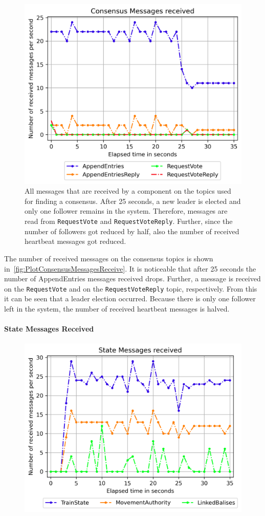 \begin{figure}[!hb]
	\centering
	\includegraphics[width=0.75\linewidth]{images/plots/ConsensusMessagesReceive}
	\caption{All messages that are received by a component on the topics used for finding a consensus. After 25 seconds, a new leader is elected and only one follower remains in the system. Therefore, messages are read from \texttt{RequestVote} and \texttt{RequestVoteReply}. Further, since the number of followers got reduced by half, also the number of received heartbeat messages got reduced.}
	\label{fig:PlotConsensusMessagesReceive}
\end{figure}

The number of received messages on the consensus topics is shown in~\autoref{fig:PlotConsensusMessagesReceive}.
It is noticeable that after 25 seconds the number of AppendEntries messages received drops.
Further, a message is received on the \texttt{RequestVote} and on the \texttt{RequestVoteReply} topic, respectively.
From this it can be seen that a leader election occurred.
Because there is only one follower left in the system, the number of received heartbeat messages is halved.


\iffalse
\paragraph{State Messages Received}

\begin{figure}[!hb]
	\centering
	\includegraphics[width=0.75\linewidth]{images/plots/StateMessagesReceive}
	\caption{}
	\label{fig:PlotStateMessagesReceive}
\end{figure}

